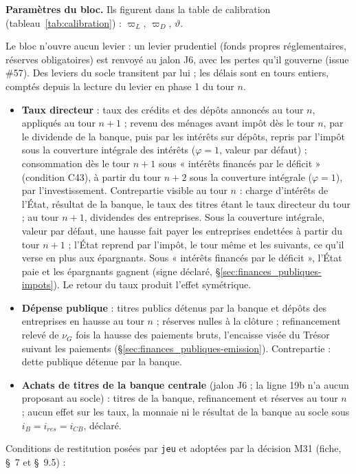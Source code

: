 \documentclass[11pt,a4paper]{article}
\begin{document}
\textbf{Paramètres du bloc.} Ils figurent dans la table de calibration (tableau~\ref{tab:calibration}) : $\varpi_L$, $\varpi_D$, $\vartheta$.

\begin{joueur}
Le bloc n'ouvre aucun levier : un levier prudentiel (fonds propres réglementaires, réserves obligatoires) est renvoyé au jalon J6, avec les pertes qu'il gouverne (issue \#57). Des leviers du socle transitent par lui ; les délais sont en tours entiers, comptés depuis la lecture du levier en phase 1 du tour $n$.
\begin{itemize}
\item \textbf{Taux directeur} : taux des crédits et des dépôts annoncés au tour $n$, appliqués au tour $n + 1$ ; revenu des ménages avant impôt dès le tour $n$, par le dividende de la banque, puis par les intérêts sur dépôts, repris par l'impôt sous la couverture intégrale des intérêts ($\varphi = 1$, valeur par défaut) ; consommation dès le tour $n + 1$ sous « intérêts financés par le déficit » (condition C43), à partir du tour $n + 2$ sous la couverture intégrale ($\varphi = 1$), par l'investissement. Contrepartie visible au tour $n$ : charge d'intérêts de l'État, résultat de la banque, le taux des titres étant le taux directeur du tour ; au tour $n + 1$, dividendes des entreprises. Sous la couverture intégrale, valeur par défaut, une hausse fait payer les entreprises endettées à partir du tour $n + 1$ ; l'État reprend par l'impôt, le tour même et les suivants, ce qu'il verse en plus aux épargnants. Sous « intérêts financés par le déficit », l'État paie et les épargnants gagnent (signe déclaré, \S\ref{sec:finances_publiques-impots}). Le retour du taux produit l'effet symétrique.
\item \textbf{Dépense publique} : titres publics détenus par la banque et dépôts des entreprises en hausse au tour $n$ ; réserves nulles à la clôture ; refinancement relevé de $\nu_G$ fois la hausse des paiements bruts, l'encaisse visée du Trésor suivant les paiements (\S\ref{sec:finances_publiques-emission}). Contrepartie : dette publique détenue par la banque.
\item \textbf{Achats de titres de la banque centrale} (jalon J6 ; la ligne 19b n'a aucun proposant au socle) : titres de la banque, refinancement et réserves au tour $n$ ; aucun effet sur les taux, la monnaie ni le résultat de la banque au socle sous $i_B = i_{\mathit{res}} = i_{\mathit{CB}}$, déclaré.
\end{itemize}
Conditions de restitution posées par \texttt{jeu} et adoptées par la décision M31 (fiche, \S~7 et \S~9.5) :

\end{joueur}
\end{document}
